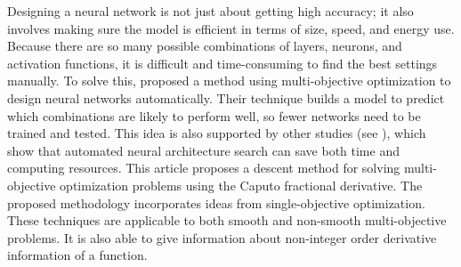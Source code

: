 \documentclass[smallextended,referee,envcountsect]{svjour3}
\begin{document}
Designing a neural network is not just about getting high accuracy; it also involves making sure the model is efficient in terms of size, speed, and energy use. Because there are so many possible combinations of layers, neurons, and activation functions, it is difficult and time-consuming to find the best settings manually. To solve this, \cite{69} proposed a method using multi-objective optimization to design neural networks automatically. Their technique builds a model to predict which combinations are likely to perform well, so fewer networks need to be trained and tested. This idea is also supported by other studies (see \cite{71}), which show that automated neural architecture search can save both time and computing resources. This article proposes a descent method for solving multi-objective optimization problems using the Caputo fractional derivative. The proposed methodology incorporates ideas from single-objective optimization. These techniques are applicable to both smooth and non-smooth multi-objective problems. It is also able to give information about non-integer order derivative information of a function.\\
\end{document}
